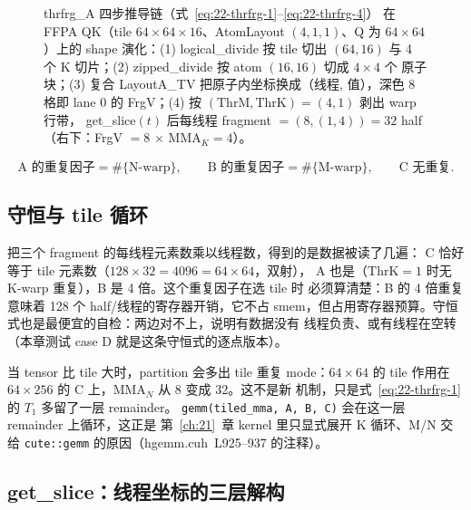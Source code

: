 \begin{figure}[H]
\caption{thrfrg\_A 四步推导链（式~\eqref{eq:22-thrfrg-1}--\eqref{eq:22-thrfrg-4}）
在 FFPA QK（tile $64\times64\times16$、AtomLayout $(4,1,1)$、Q 为
$64\times64$）上的 shape 演化：(1) logical\_divide 按 tile 切出 $(64,16)$
与 4 个 K 切片；(2) zipped\_divide 按 atom $(16,16)$ 切成 $4\times4$ 个
原子块；(3) 复合 LayoutA\_TV 把原子内坐标换成（线程, 值），深色 8 格即
lane 0 的 FrgV；(4) 按 $(\mathrm{ThrM},\mathrm{ThrK})=(4,1)$ 剥出 warp 行带，
get\_slice$(t)$ 后每线程 fragment $=(8,(1,4))=32$ half（右下：FrgV $=8$
$\times$ $\mathrm{MMA}_K=4$）。}
\label{fig:22-thrfrg-chain}
\end{figure}

\begin{equation}
  \text{A 的重复因子} = \#\{\text{N-warp}\},\qquad
  \text{B 的重复因子} = \#\{\text{M-warp}\},\qquad
  \text{C 无重复} .
  \label{eq:22-dup}
\end{equation}

\subsection{守恒与 tile 循环}

把三个 fragment 的每线程元素数乘以线程数，得到的是数据被读了几遍：
C 恰好等于 tile 元素数（$128\times32 = 4096 = 64\times64$，双射），
A 也是（$\mathrm{ThrK}=1$ 时无 K-warp 重复），B 是 4 倍。这个重复因子在选 tile 时
必须算清楚：B 的 4 倍重复意味着 128 个 half/线程的寄存器开销，它不占
smem，但占用寄存器预算。守恒式也是最便宜的自检：两边对不上，说明有数据没有
线程负责、或有线程在空转（本章测试 case D 就是这条守恒式的逐点版本）。

当 tensor 比 tile 大时，partition 会多出 tile 重复 mode：$64\times64$ 的
tile 作用在 $64\times256$ 的 C 上，$\mathrm{MMA}_N$ 从 8 变成 32。这不是新
机制，只是式~\eqref{eq:22-thrfrg-1} 的 $T_1$ 多留了一层 remainder。
\texttt{gemm\allowbreak{}(tiled\_\allowbreak{}mma,\allowbreak{} A,\allowbreak{} B,\allowbreak{} C)} 会在这一层 remainder 上循环，这正是
第~\ref{ch:21}~章 kernel 里只显式展开 K 循环、M/N 交给 \texttt{cute::gemm}
的原因（hgemm.cuh~L925--937 的注释）。

\subsection{get\_slice：线程坐标的三层解构}

